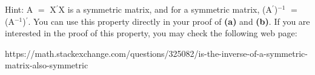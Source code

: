 \documentclass{article}
\newcommand{\mt}[1]{\ensuremath{#1}}
\newcommand{\bpth}[1]{\textbf{(#1)}}
\newcommand{\eql}{ \mt{\operatorname{=}} }
\newcommand{\pr}{\mt{^\prime}} 		   %
\newcommand{\uf}[2]{#1\mt{^{#2}}}
\begin{document}
{Hint: A\eql X\pr X is a symmetric matrix, and for a symmetric matrix, \uf{(A\pr)}{-1} \eql (\uf{A}{-1})\pr. You can use this property directly in your proof of \bpth{a} and \bpth{b}. If you are interested in the proof of this property, you may check the following web page:

https://math.stackexchange.com/questions/325082/is-the-inverse-of-a-symmetric-matrix-also-symmetric

}
\end{document}
